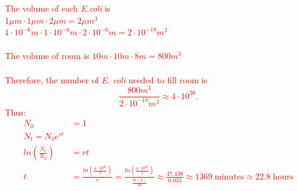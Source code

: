 \documentclass{article}
\newcommand{\ind}{\-\hspace{1cm}}
\begin{document}
\vspace{0.1cm}
\textcolor{red}{
The volume of each \emph{E.coli} is \\
\ind $1\mu m \cdot 1\mu m \cdot 2\mu m = 2\mu m^3$ \\
\ind $ 1\cdot 10^{-6}m \cdot 1\cdot 10^{-6}m \cdot 2\cdot 10^{-6}m = 2 \cdot 10^{-18}m^3$\\ 
\\
The volume of room is
\ind $10 m \cdot 10 m \cdot 8 m = 800m^3$\\
\\
Therefore, the number of \emph{E. coli} needed to fill room is
\begin{equation*}
	\frac{800 m^3}{2 \cdot 10^{-18} m^3}\approx 4 \cdot 10^{20}.
\end{equation*}
Thus:\\
\begin{align*}
	N_0&=1\\
	N_t=N_0 e^{rt}\\
	ln\left(\frac{N_t}{N_0}\right)&=rt\\
	t&=\frac{ln \left(\frac{4\cdot 10^{20}}{1}\right)}{r}=\frac{ln \left(\frac{4\cdot 
	10^{20}}{1}\right)}{\frac{ln(2)}{20}} \approx \frac{47.438}{0.035} \approx 1369 
	\; \text{minutes} \approx 22.8 \; \text{hours}
\end{align*}}
\end{document}
